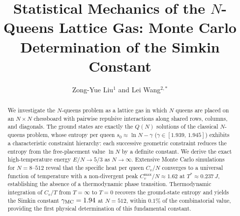\documentclass{iopjournal}
\begin{document}

\title{Statistical Mechanics of the $N$-Queens Lattice Gas: Monte Carlo Determination of the Simkin Constant}

\author{Zong-Yue Liu$^{1}$ and Lei Wang$^{2,*}$}






\begin{abstract}
We investigate the $N$-queens problem as a lattice gas in which
$N$ queens are placed on an $N \times N$ chessboard with pairwise
repulsive interactions along shared rows, columns, and diagonals.
The ground states are exactly the $Q(N)$ solutions of the classical
$N$-queens problem, whose entropy per queen
$s_0 \approx \ln N - \gamma$ ($\gamma \in [1.939,\, 1.945]$)
exhibits a characteristic constraint hierarchy: each successive
geometric constraint reduces the entropy from the free-placement
value $\ln N$ by a definite constant.
We derive the exact high-temperature energy $E/N \to 5/3$ as
$N \to \infty$.
Extensive Monte Carlo simulations for $N = 8$--$512$ reveal that
the specific heat per queen $C_v/N$ converges to a universal
function of temperature with a non-divergent peak
$C_v^{\max}/N \approx 1.62$ at $T^* \approx 0.237\,J$,
establishing the absence of a thermodynamic phase transition.
Thermodynamic integration of $C_v/T$ from $T = \infty$ to $T = 0$
recovers the ground-state entropy and yields the Simkin constant
$\gamma_{\rm MC} = 1.94$ at $N = 512$, within $0.1\%$ of the
combinatorial value, providing the first physical determination of
this fundamental constant.
\end{abstract}

\maketitle
\end{document}
